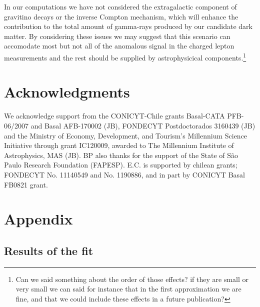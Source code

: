\documentclass[a4paper,11pt]{article}
\begin{document}
In our computations we have not considered the extragalactic component of gravitino decays or the inverse Compton mechanism, which will enhance the contribution to the total amount of gamma-rays produced by our candidate dark matter. By considering these issues we may suggest that this scenario can accomodate most but not all of the anomalous signal in the charged lepton measurements and the rest should be supplied by astrophysicical components.\footnote{Can we said something about the order of those effects? if they are small or very small we can said for instance that in the first approximation we are fine, and that we could include these effects in a future publication?} 

\section*{Acknowledgments}

{\small 
We acknowledge support from the CONICYT-Chile grants Basal-CATA
PFB-06/2007 and Basal AFB-170002 (JB), FONDECYT Postdoctorados 3160439 (JB) and the Ministry of Economy, Development, and Tourism's Millennium Science Initiative through grant IC120009, awarded to The Millennium Institute of Astrophysics, MAS (JB). BP also thanks for the support of the State of S\~{a}o Paulo Research Foundation (FAPESP). E.C. is supported by chilean grants; FONDECYT No. 11140549 and No. 1190886, and in part
by CONICYT Basal FB0821 grant.


}

\appendix
\section{Appendix}
\subsection{Results of the fit}
\end{document}

